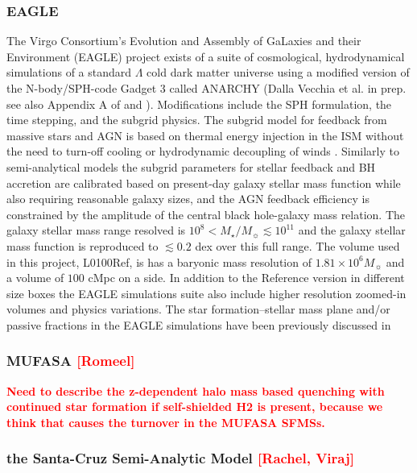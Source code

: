 \documentclass[preprint2,tighten]{aastex62}
\newcommand{\todo}[1]{{\bf \textcolor{red}{ #1}}}
\begin{document}
\subsubsection{EAGLE}
The Virgo Consortium's Evolution and Assembly of GaLaxies and their Environment (EAGLE) project \citep{schaye2015, crain2015} exists of a suite of cosmological, hydrodynamical simulations of a standard $\Lambda$ cold dark matter universe using a modified version of the N-body/SPH-code Gadget 3 \citep[lastly described in][]{springel2005} called ANARCHY (Dalla Vecchia et al. in prep. see also Appendix A of \citealp{schaye2015} and \citealp{schaller2015}). Modifications include the SPH formulation, the time stepping, and the subgrid physics. The subgrid model for feedback from massive stars and AGN is based on thermal energy injection in the ISM without the need to turn-off cooling or hydrodynamic decoupling of winds \citep{dallavecchia2012}. Similarly to semi-analytical models the subgrid parameters for stellar feedback and BH accretion are calibrated based on present-day galaxy stellar mass function while also requiring reasonable galaxy sizes, and the AGN feedback efficiency is constrained by the amplitude of the central black hole-galaxy mass relation. The galaxy stellar mass range resolved is $10^{8} < M_{\star}/M_{\sun} \lesssim 10^{11}$ and the galaxy stellar mass function is reproduced to $\lesssim 0.2$ dex over this full range. The volume used in this project, L0100Ref, is has a baryonic mass resolution of $1.81\times 10^6M_{\sun}$ and a volume of $100$ cMpc on a side. In addition to the Reference version in different size boxes the EAGLE simulations suite also include higher resolution zoomed-in volumes and physics variations. The star formation--stellar mass plane and/or passive fractions in the EAGLE simulations have been previously discussed in \citet{furlong2015, trayford2015, trayford2016, trayford2017}


\subsubsection{MUFASA \todo{[Romeel]}}
\todo{Need to describe the z-dependent halo mass based quenching with continued star formation if self-shielded H2 is present, because we think that causes the turnover in the MUFASA SFMSs.}

\subsubsection{the Santa-Cruz Semi-Analytic Model \todo{[Rachel, Viraj]}}
\end{document}
